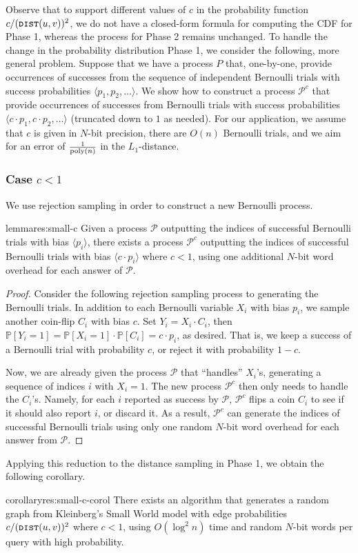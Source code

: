 Observe that to support different values of $c$ in the probability function $c/(\texttt{\textsc{dist}}(u,v))^2$, we do not have a closed-form formula for computing the CDF for Phase 1, whereas the process for Phase 2 remains unchanged. To handle the change in the probability distribution Phase 1, we consider the following, more general problem. Suppose that we have a process $P$ that, one-by-one, provide occurrences of successes from the sequence of independent Bernoulli trials with success probabilities $\langle p_1, p_2, \ldots \rangle$. We show how to construct a process $\mathcal{P}^c$ that provide occurrences of successes from Bernoulli trials with success probabilities $\langle c\cdot p_1, c\cdot p_2, \ldots\rangle$ (truncated down to $1$ as needed). For our application, we assume that $c$ is given in $N$-bit precision, there are $O(n)$ Bernoulli trials, and we aim for an error of $\frac{1}{\mathrm{poly}(n)}$ in the $L_1$-distance.

\subsubsection{Case $c < 1$}
We use rejection sampling in order to construct a new Bernoulli process.

\begin{restatable}{lemma}{res:small-c}
Given a process $\mathcal{P}$ outputting the indices of successful Bernoulli trials with bias $\langle p_i\rangle$, there exists a process $\mathcal{P}^c$ outputting the indices of successful Bernoulli trials with bias $\langle c\cdot p_i\rangle$ where $c<1$,
using one additional $N$-bit word overhead for each answer of $\mathcal{P}$.
\end{restatable}
\begin{proof}
Consider the following rejection sampling process to generating the Bernoulli trials.
In addition to each Bernoulli variable $X_i$ with bias $p_i$, we sample another coin-flip $C_i$ with bias $c$.
Set $Y_i = X_i \cdot C_i$, then $\mathbb P[Y_i = 1] = \mathbb P[X_i = 1]\cdot\mathbb P[C_i] = c\cdot p_i$, as desired.
That is, we keep a success of a Bernoulli trial with probability $c$, or reject it with probability $1-c$.

Now, we are already given the process $\mathcal{P}$ that ``handles'' $X_i$'s, generating a sequence of indices $i$ with $X_i = 1$.
The new process $\mathcal{P}^c$ then only needs to handle the $C_i$'s. Namely, for each $i$ reported as success by $\mathcal{P}$, $\mathcal{P}^c$ flips a coin $C_i$ to see if it should also report $i$, or discard it.
As a result, $\mathcal{P}^c$ can generate the indices of successful Bernoulli trials using only one random $N$-bit word overhead for each answer from $\mathcal{P}$.
\end{proof}
Applying this reduction to the distance sampling in Phase 1, we obtain the following corollary.
\begin{restatable}{corollary}{res:small-c-corol}
There exists an algorithm that generates a random graph from Kleinberg's Small World model with edge probabilities $c/(\texttt{\textsc{dist}}(u,v))^2$ where $c<1$,
using $O(\log^2 n)$ time and random $N$-bit words per  query with high probability.
\end{restatable}

